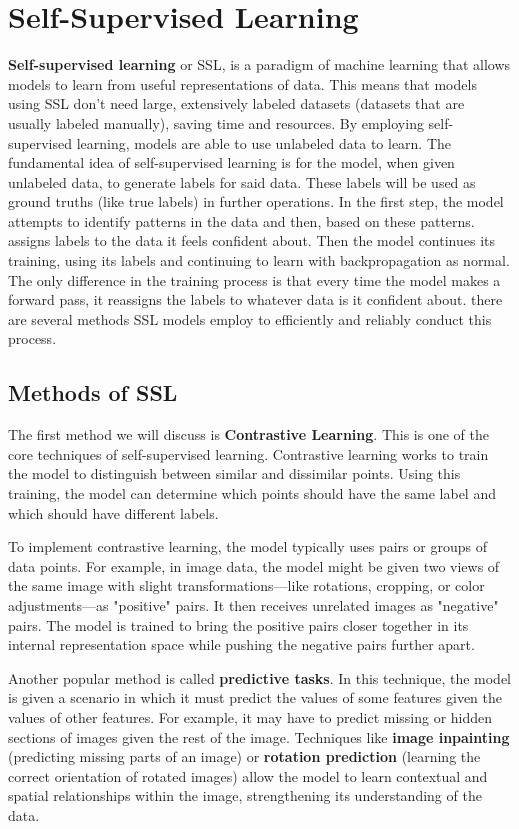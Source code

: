 \section{Self-Supervised Learning}
    \large \textbf{Self-supervised learning} or SSL, is a paradigm of machine learning that allows models to learn from useful representations of data. This means that models using SSL don't need large, extensively labeled datasets (datasets that are usually labeled manually), saving time and resources. By employing self-supervised learning, models are able to use unlabeled data to learn. The fundamental idea of self-supervised learning is for the model, when given unlabeled data, to generate labels for said data. These labels will be used as ground truths (like true labels) in further operations. In the first step, the model attempts to identify patterns in the data and then, based on these patterns. assigns labels to the data it feels confident about. Then the model continues its training, using its labels and continuing to learn with backpropagation as normal. The only difference in the training process is that every time the model makes a forward pass, it reassigns the labels to whatever data is it confident about. there are several methods SSL models employ to efficiently and reliably conduct this process.
\subsection{Methods of SSL}
    \large The first method we will discuss is \textbf{Contrastive Learning}. This is one of the core techniques of self-supervised learning. Contrastive learning works to train the model to distinguish between similar and dissimilar points. Using this training, the model can determine which points should have the same label and which should have different labels. \newline  
    
    To implement contrastive learning, the model typically uses pairs or groups of data points. For example, in image data, the model might be given two views of the same image with slight transformations—like rotations, cropping, or color adjustments—as "positive" pairs. It then receives unrelated images as "negative" pairs. The model is trained to bring the positive pairs closer together in its internal representation space while pushing the negative pairs further apart. \newline 

    Another popular method is called \textbf{predictive tasks}. In this technique, the model is given a scenario in which it must predict the values of some features given the values of other features. For example, it may have to predict missing or hidden sections of images given the rest of the image. Techniques like \textbf{image inpainting} (predicting missing parts of an image) or \textbf{rotation prediction} (learning the correct orientation of rotated images) allow the model to learn contextual and spatial relationships within the image, strengthening its understanding of the data.

